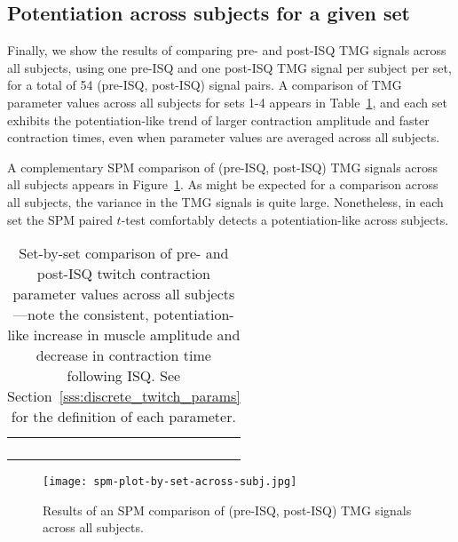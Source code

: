 \documentclass[utf8]{FrontiersinHarvard}
\begin{document}
\subsection{Potentiation across subjects for a given set}
Finally, we show the results of comparing pre- and post-ISQ TMG signals across all subjects, using one pre-ISQ and one post-ISQ TMG signal per subject per set, for a total of 54 (pre-ISQ, post-ISQ) signal pairs.
A comparison of TMG parameter values across all subjects for sets 1-4 appears in Table~\ref{tab:tmg_params_across_subj_by_set}, and each set exhibits the potentiation-like trend of larger contraction amplitude and faster contraction times, even when parameter values are averaged across all subjects.

A complementary SPM comparison of (pre-ISQ, post-ISQ) TMG signals across all subjects appears in Figure~\ref{fig:spm_example_across_subj_by_set}.
As might be expected for a comparison across all subjects, the variance in the TMG signals is quite large.
Nonetheless, in each set the SPM paired $ t $-test comfortably detects a potentiation-like across subjects.

\begin{table}
    \centering
    \caption{Set-by-set comparison of pre- and post-ISQ twitch contraction parameter values across all subjects---note the consistent, potentiation-like increase in muscle amplitude and decrease in contraction time following ISQ.
    See Section~\ref{sss:discrete_twitch_params} for the definition of each parameter.}
    \vspace{1ex}

    \renewcommand{\arraystretch}{1.2}
    \begin{tabular}{c}
         \hfill \\
         \hfill \\
         \hfill \\
         \hfill \\
    \end{tabular}

    \label{tab:tmg_params_across_subj_by_set}
\end{table}

\begin{figure}
	\centering
    \texttt{[image: spm-plot-by-set-across-subj.jpg]}
    \caption{Results of an SPM comparison of (pre-ISQ, post-ISQ) TMG signals across all subjects.}
    \label{fig:spm_example_across_subj_by_set}
\end{figure}
\end{document}
